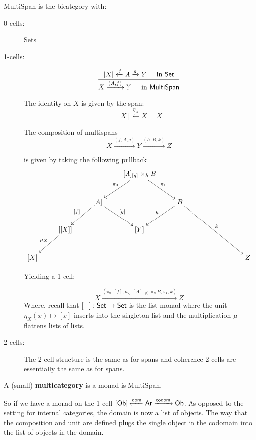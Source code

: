 \begin{definition}
{\sf MultiSpan} is the bicategory with:

\begin{description}
\item[0-cells:] Sets
\item[1-cells:] 

$$
\dfrac{[X] \xleftarrow{f} A \xrightarrow{g} Y \hspace*{.5cm}\text{in $\mathsf{Set}$}}
{X \xrightarrow{(A,f)} Y  \hspace*{.5cm}\text{in {\sf MultiSpan}}}
$$

The identity on $X$ is given by the span:
$$ [X] \xleftarrow{\eta_X } X = X$$


The composition of multispans
$$X \xrightarrow{(f,A,g)} Y\xrightarrow{(h,B,k)} Z $$

is given by taking the following pullback
$$
\xymatrix{
     &         &      &[A] {}_{[g]}\times_h B \ar[dr]^{\pi_1} \ar[dl]_{\pi_0} \\
     &         &[A] \ar[dr]^{[g]} \ar[dl]_{[f]}&      & B \ar[dl]_h \ar[ddrrr]^k &   & \\
     & [[X]] \ar[dl]_{\mu_X} &      &[Y] &    &    &  \\
[X] &         &      &     &    &    &&Z
}
$$

Yielding a 1-cell:

$$
X\xrightarrow{(\pi_0;[f];\mu_X, [A] {}_{[g]}\times_h B, \pi_1;k)} Z
$$
Where, recall that $[-]:\mathsf{Set}\to\mathsf{Set} $ is the list monad where the unit $\eta_X(x)\mapsto [x]$ inserts into the singleton list  and the multiplication $\mu$ flattens lists of lists.

\item[2-cells:] The 2-cell structure is the same as for spans and coherence 2-cells are essentially the same as for spans.

\end{description}
\end{definition}


\begin{definition}
A (small) {\bf multicategory} is a monad is {\sf MultiSpan}.
\end{definition}

So if we have a monad on the 1-cell $[ {\sf Ob}] \xleftarrow{\sf dom} {\sf Ar} \xrightarrow{\sf codom} {\sf Ob}$.  As opposed to the setting for internal categories, the domain is now a list of objects.  The way that the composition and unit are defined plugs the single object in the codomain into the list of objects in the domain.


